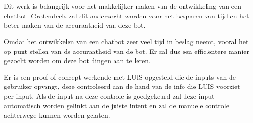 
%
%

%



\chapter*{}

Dit werk is belangrijk voor het makkelijker maken van de ontwikkeling van een chatbot. Grotendeels zal dit onderzocht worden voor het besparen van tijd en het beter maken van de accuraatheid van deze bot.

Omdat het ontwikkelen van een chatbot zeer veel tijd in beslag neemt, vooral het op punt stellen van de accuraatheid van de bot. Er zal dus een efficiëntere manier gezocht worden om deze bot dingen aan te leren.

Er is een proof of concept werkende met LUIS opgesteld die de inputs van de gebruiker opvangt, deze controleerd aan de hand van de info die LUIS voorziet per input. Als de input na deze controle is goedgekeurd zal deze input automatisch worden gelinkt aan de juiste intent en zal de manuele controle achterwege kunnen worden gelaten.

